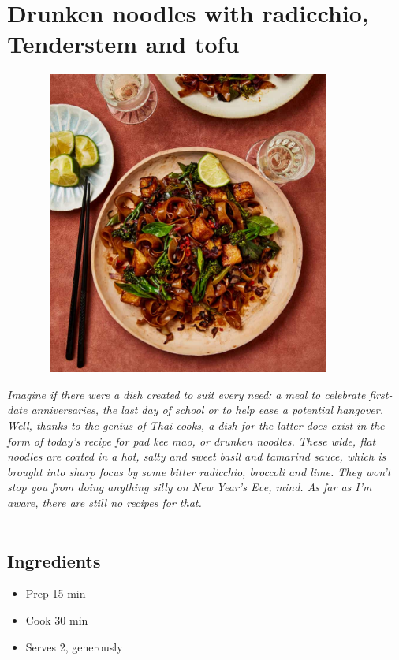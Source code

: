 \documentclass{book}
\begin{document}
\section{Drunken noodles with radicchio, Tenderstem and tofu}
\begin{figure}
\centering\includegraphics[width=10cm,height=10cm,keepaspectratio]{Recipe_Pictures/Drunken_noodles_with_radicchio,_Tenderstem_and_tofu.png}
\end{figure}
\emph{Imagine if there were a dish created to suit every need: a meal to celebrate first-date anniversaries, the last day of school or to help ease a potential hangover. Well, thanks to the genius of Thai cooks, a dish for the latter does exist in the form of today’s recipe for pad kee mao, or drunken noodles. These wide, flat noodles are coated in a hot, salty and sweet basil and tamarind sauce, which is brought into sharp focus by some bitter radicchio, broccoli and lime. They won’t stop you from doing anything silly on New Year’s Eve, mind. As far as I’m aware, there are still no recipes for that.}\\\\ 
\subsection*{Ingredients}
\begin{itemize}
\item Prep 15 min
\item Cook 30 min
\item Serves 2, generously
\end{itemize}
\end{document}
